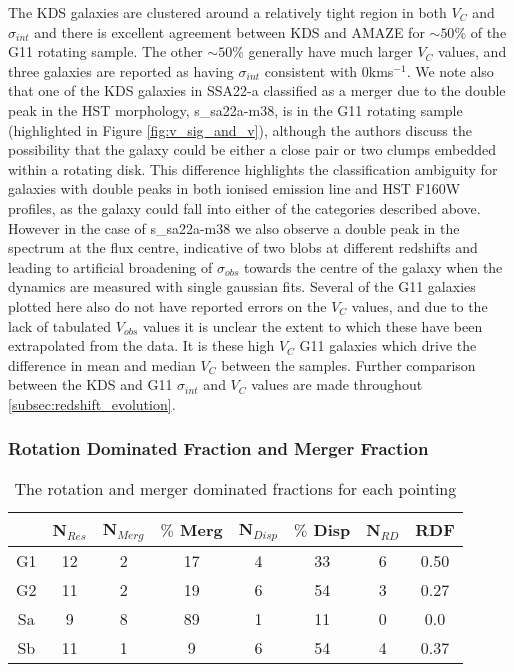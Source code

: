 \documentclass[fleqn,usenatbib]{mn2e}
\begin{document}
The KDS galaxies are clustered around a relatively tight region in both $V_{C}$ and $\sigma_{int}$ and there is excellent agreement between KDS and AMAZE for $ \sim 50\%$ of the G11 rotating sample.
The other $ \sim 50\%$ generally have much larger $V_{C}$ values, and three galaxies are reported as having $\sigma_{int}$ consistent with 0kms$^{-1}$.
We note also that one of the KDS galaxies in SSA22-a classified as a merger due to the double peak in the HST morphology, s\_sa22a-m38, is in the G11 rotating sample (highlighted in Figure \ref{fig:v_sig_and_v}), although the authors discuss the possibility that the galaxy could be either a close pair or two clumps embedded within a rotating disk.
This difference highlights the classification ambiguity for galaxies with double peaks in both ionised emission line and HST F160W profiles, as the galaxy could fall into either of the categories described above.
However in the case of s\_sa22a-m38 we also observe a double peak in the spectrum at the flux centre, indicative of two blobs at different redshifts and leading to artificial broadening of $\sigma_{obs}$ towards the centre of the galaxy when the dynamics are measured with single gaussian fits.
Several of the G11 galaxies plotted here also do not have reported errors on the $V_{C}$ values, and due to the lack of tabulated $V_{obs}$ values it is unclear the extent to which these have been extrapolated from the data.
It is these high $V_{C}$ G11 galaxies which drive the difference in mean and median $V_{C}$ between the samples.
Further comparison between the KDS and G11 $\sigma_{int}$ and $V_{C}$ values are made throughout \cref{subsec:redshift_evolution}. 

\subsubsection{Rotation Dominated Fraction and Merger Fraction}\label{subsubsec:rotation_and_mergers}
\begin{table}
    \centering
\begin{tabular}{ c c c c c c c c }

 \hline
 & N$_{Res}$ & N$_{Merg}$ & $\%$ Merg & N$_{Disp}$ & $\%$ Disp & N$_{RD}$ & RDF  \\
 \hline
G1 & 12 & 2 & 17 & 4 & 33 & 6 & 0.50 \\
G2 &  11 & 2 & 19 & 6 & 54 & 3 & 0.27\\
Sa & 9 & 8 & 89 & 1 & 11 & 0 & 0.0 \\
Sb & 11 & 1 & 9 & 6 & 54 & 4 & 0.37 \\
 \hline
\end{tabular}
\caption{The rotation and merger dominated fractions for each pointing}
\label{tab:rdf}
\end{table}
\end{document}
